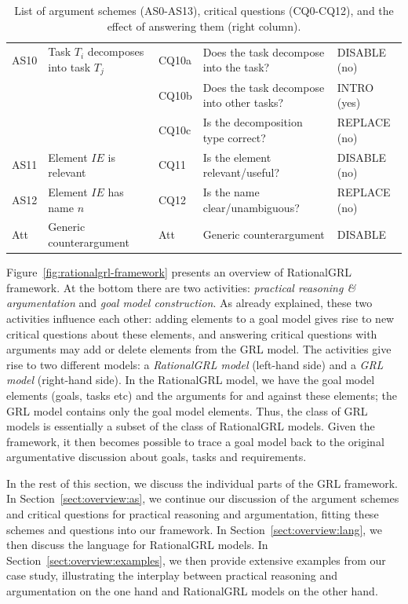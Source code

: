 \begin{table}[t]
\begin{tabularx}{\textwidth}{|l|l|l|X|l|}
\hline
AS10 & Task $T_i$ decomposes into task $T_j$ & CQ10a & Does the task decompose into the task? & \textsf{DISABLE} (no)\\
 &  & CQ10b & Does the task decompose into other tasks?& \textsf{INTRO} (yes)\\
 &  & CQ10c & Is the decomposition type correct? & \textsf{REPLACE} (no)\\
\hline
AS11 & Element $IE$ is relevant & CQ11 & Is the element relevant/useful? & \textsf{DISABLE} (no)\\
\hline
AS12 & Element $IE$ has name $n$ & CQ12 & Is the name clear/unambiguous? & \textsf{REPLACE} (no)\\
\hline
\hline
Att & Generic counterargument & Att & Generic counterargument & \textsf{DISABLE}\\
\hline
\end{tabularx}
\caption{List of argument schemes (AS0-AS13), critical questions (CQ0-CQ12), and the effect of answering them (right column).}
\label{table:argument-schemes}
\end{table}


Figure~\ref{fig:rationalgrl-framework} presents an overview of RationalGRL framework. At the bottom there are two activities: \emph{practical reasoning \& argumentation} and \emph{goal model construction}. As already explained, these two activities influence each other: adding elements to a goal model gives rise to new critical questions about these elements, and answering critical questions with arguments may add or delete elements from the GRL model. The activities give rise to two different models: a \emph{RationalGRL model} (left-hand side) and a \emph{GRL model} (right-hand side). In the RationalGRL model, we have the goal model elements (goals, tasks etc) and the arguments for and against these elements; the GRL model contains only the goal model elements. Thus, the class of GRL models is essentially a subset of the class of RationalGRL models. Given the framework, it then becomes possible to trace a goal model back to the original argumentative discussion about goals, tasks and requirements. 

In the rest of this section, we discuss the individual parts of the GRL framework. In Section~\ref{sect:overview:as}, we continue our discussion of the argument schemes and critical questions for practical reasoning and argumentation, fitting these schemes and questions into our framework. In Section~\ref{sect:overview:lang}, we then discuss the language for RationalGRL models. In Section~\ref{sect:overview:examples}, we then provide extensive examples from our case study, illustrating the interplay between practical reasoning and argumentation on the one hand and RationalGRL models on the other hand.  

